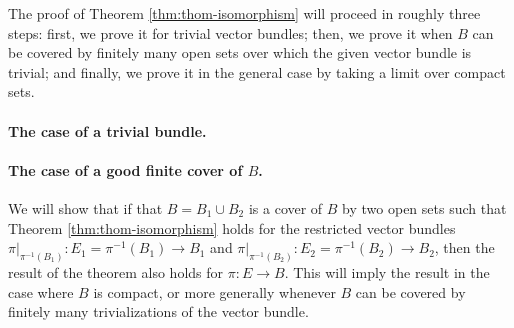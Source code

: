 \documentclass[10pt]{article}
\providecommand{\inv}{^{-1}}
\begin{document}
The proof of Theorem \ref{thm:thom-isomorphism}
will proceed in roughly three steps:
first, we prove it for trivial vector bundles;
then, we prove it when $B$ can be covered by
finitely many open sets over which the given vector bundle is trivial;
and finally, we prove it in the general case
by taking a limit over compact sets.

\paragraph{The case of a trivial bundle.}


\paragraph{The case of a good finite cover of $B$.}
We will show that 
if that $B = B_1 \cup B_2$ is a cover of $B$ by two open sets
such that Theorem \ref{thm:thom-isomorphism} holds for
the restricted vector bundles
$\pi|_{\pi\inv(B_1)}\colon E_1 = \pi\inv(B_1)\to B_1$ and
$\pi|_{\pi\inv(B_2)}\colon E_2 = \pi\inv(B_2)\to B_2$,
then the result of the theorem also holds for $\pi\colon E\to B$.
This will imply the result in the case where $B$ is compact,
or more generally whenever $B$ can be covered by finitely many
trivializations of the vector bundle.
\end{document}

